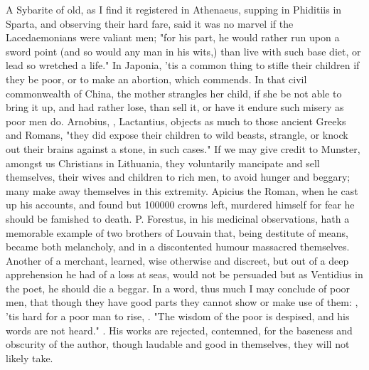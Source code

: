 A Sybarite of old, as I find it registered in Athenaeus,
supping in Phiditiis in Sparta, and observing their hard fare, said it was no
marvel if the Lacedaemonians were valiant men; "for his part, he would rather
run upon a sword point (and so would any man in his wits,) than live with such
base diet, or lead so wretched a life." In Japonia, 'tis a
common thing to stifle their children if they be poor, or to make an abortion,
which \Aristotle{} commends. In that civil commonwealth of China,
the mother strangles her child, if she be not able to
bring it up, and had rather lose, than sell it, or have it endure such misery
as poor men do. Arnobius, ,
Lactantius,  objects
as much to those ancient Greeks and Romans, "they did expose their children to
wild beasts, strangle, or knock out their brains against a stone, in such
cases." If we may give credit to Munster, amongst us
Christians in Lithuania, they voluntarily mancipate and sell themselves, their
wives and children to rich men, to avoid hunger and beggary;
many make away themselves in this extremity. Apicius the
Roman, when he cast up his accounts, and found but 100\thinspace{}000 crowns
left, murdered himself for fear he should be famished to death. P. Forestus, in
his medicinal observations, hath a memorable example of two brothers of Louvain
that, being destitute of means, became both melancholy, and in a discontented
humour massacred themselves. Another of a merchant, learned, wise otherwise and
discreet, but out of a deep apprehension he had of a loss at seas, would not be
persuaded but as Ventidius in the poet, he should die a
beggar. In a word, thus much I may conclude of poor men, that though they have
good parts they cannot show or make use of them:
, 'tis hard for
a poor man to rise, . "The wisdom of the
poor is despised, and his words are not heard." .
His works are rejected, contemned, for the baseness and obscurity of the
author, though laudable and good in themselves, they will not likely take.


